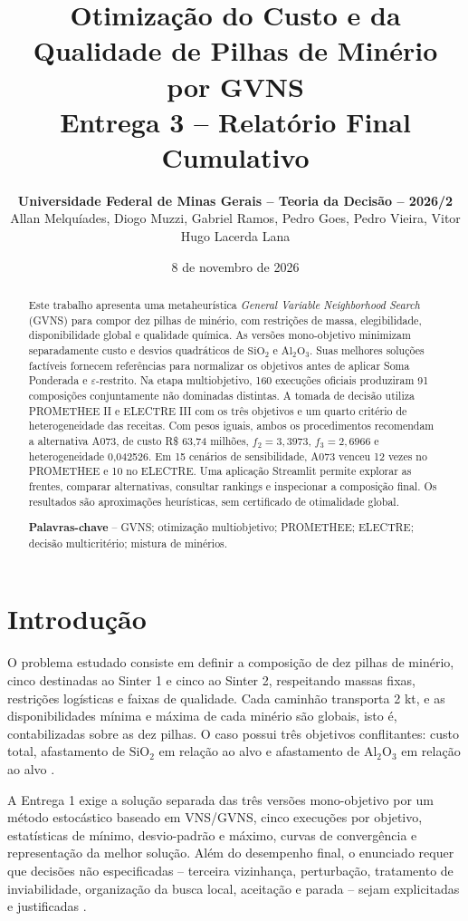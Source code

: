 \documentclass[10pt,twocolumn,a4paper]{article}
\title{\LARGE \textbf{Otimização do Custo e da Qualidade de Pilhas de Minério por GVNS}\\[0.3em]
\large Entrega 3 -- Relatório Final Cumulativo}
\author{\textbf{Universidade Federal de Minas Gerais -- Teoria da Decisão -- 2026/2}\\[0.2em]
\small Allan Melquíades, Diogo Muzzi, Gabriel Ramos, Pedro Goes, Pedro Vieira, Vitor Hugo Lacerda Lana}
\date{8 de novembro de 2026}
\begin{document}
\maketitle

\begin{abstract}
\noindent Este trabalho apresenta uma metaheurística \textit{General Variable Neighborhood Search} (GVNS) para compor dez pilhas de minério, com restrições de massa, elegibilidade, disponibilidade global e qualidade química. As versões mono-objetivo minimizam separadamente custo e desvios quadráticos de $\text{SiO}_2$ e $\text{Al}_2\text{O}_3$. Suas melhores soluções factíveis fornecem referências para normalizar os objetivos antes de aplicar Soma Ponderada e $\varepsilon$-restrito. Na etapa multiobjetivo, 160 execuções oficiais produziram 91 composições conjuntamente não dominadas distintas. A tomada de decisão utiliza PROMETHEE II e ELECTRE III com os três objetivos e um quarto critério de heterogeneidade das receitas. Com pesos iguais, ambos os procedimentos recomendam a alternativa A073, de custo R\$ 63,74 milhões, $f_2=3{,}3973$, $f_3=2{,}6966$ e heterogeneidade 0,042526. Em 15 cenários de sensibilidade, A073 venceu 12 vezes no PROMETHEE e 10 no ELECTRE. Uma aplicação Streamlit permite explorar as frentes, comparar alternativas, consultar rankings e inspecionar a composição final. Os resultados são aproximações heurísticas, sem certificado de otimalidade global.

\vspace{0.3em}
\noindent\textbf{Palavras-chave} -- GVNS; otimização multiobjetivo; PROMETHEE; ELECTRE; decisão multicritério; mistura de minérios.
\end{abstract}

\section{Introdução}

O problema estudado consiste em definir a composição de dez pilhas de minério, cinco destinadas ao Sinter 1 e cinco ao Sinter 2, respeitando massas fixas, restrições logísticas e faixas de qualidade. Cada caminhão transporta 2 kt, e as disponibilidades mínima e máxima de cada minério são globais, isto é, contabilizadas sobre as dez pilhas. O caso possui três objetivos conflitantes: custo total, afastamento de $\text{SiO}_2$ em relação ao alvo e afastamento de $\text{Al}_2\text{O}_3$ em relação ao alvo \cite{case_enunciado}.

A Entrega 1 exige a solução separada das três versões mono-objetivo por um método estocástico baseado em VNS/GVNS, cinco execuções por objetivo, estatísticas de mínimo, desvio-padrão e máximo, curvas de convergência e representação da melhor solução. Além do desempenho final, o enunciado requer que decisões não especificadas -- terceira vizinhança, perturbação, tratamento de inviabilidade, organização da busca local, aceitação e parada -- sejam explicitadas e justificadas \cite{case_enunciado}.
\end{document}
